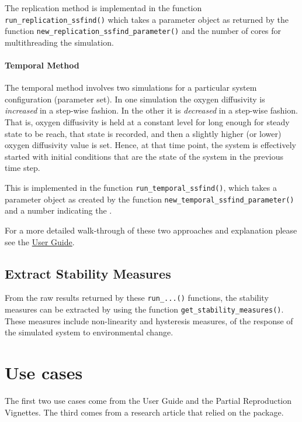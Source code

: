\documentclass[
]{article}
\begin{document}
The replication method is implementad in the function \texttt{run\_replication\_ssfind()} which takes a parameter object as returned by the function \texttt{new\_replication\_ssfind\_parameter()} and the number of cores for multithreading the simulation.

\hypertarget{temporal-method}{%
\paragraph{Temporal Method}\label{temporal-method}}

The temporal method involves two simulations for a particular system configuration (parameter set). In one simulation the oxygen diffusivity is \emph{increased} in a step-wise fashion. In the other it is \emph{decreased} in a step-wise fashion. That is, oxygen diffusivity is held at a constant level for long enough for steady state to be reach, that state is recorded, and then a slightly higher (or lower) oxygen diffusivity value is set. Hence, at that time point, the system is effectively started with initial conditions that are the state of the system in the previous time step.

This is implemented in the function \texttt{run\_temporal\_ssfind()}, which takes a parameter object as created by the function \texttt{new\_temporal\_ssfind\_parameter()} and a number indicating the .

For a more detailed walk-through of these two approaches and explanation please see the \href{@LINK_NEEDED}{User Guide}.

\hypertarget{extract-stability-measures}{%
\subsection{Extract Stability Measures}\label{extract-stability-measures}}

From the raw results returned by these \texttt{run\_...()} functions, the stability measures can be extracted by using the function \texttt{get\_stability\_measures()}. These measures include non-linearity and hysteresis measures, of the response of the simulated system to environmental change.

\hypertarget{use-cases}{%
\section{Use cases}\label{use-cases}}

The first two use cases come from the User Guide and the Partial Reproduction Vignettes. The third comes from a research article that relied on the package.
\end{document}
